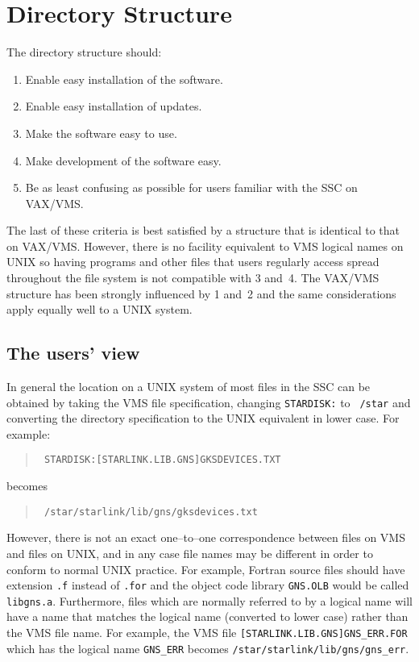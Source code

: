 \section{Directory Structure}
The directory structure should:
\begin{enumerate}
\item Enable easy installation of the software.
\item Enable easy installation of updates.
\item Make the software easy to use.
\item Make development of the software easy.
\item Be as least confusing as possible for users familiar with the SSC on
VAX/VMS.
\end{enumerate}

The last of these criteria is best satisfied by a structure that is identical
to that on VAX/VMS. However, there is no facility equivalent to VMS logical
names on UNIX so having programs and other files that users regularly access
spread throughout the file system is not compatible with 3 and~4. The VAX/VMS
structure has been strongly influenced by 1 and~2 and the same considerations
apply equally well to a UNIX system.

\subsection{The users' view}
In general the location on a UNIX system of most files in the SSC can be
obtained by taking the VMS file specification, changing {\tt STARDISK:} to {\tt
/star} and converting the directory specification to the UNIX equivalent in
lower case. For example:
\begin{quote}\tt
STARDISK:[STARLINK.LIB.GNS]GKSDEVICES.TXT
\end{quote}
becomes
\begin{quote}\tt
/star/starlink/lib/gns/gksdevices.txt
\end{quote}

However, there is not an exact one--to--one correspondence between files on VMS
and files on UNIX, and in any case file names may be different in
order to conform to normal UNIX practice. For example, Fortran source files
should have extension {\tt .f} instead of {\tt .for} and the object code
library {\tt GNS.OLB} would be
called {\tt libgns.a}. Furthermore, files which are normally referred to by a
logical name will have a name that matches the logical name (converted to lower
case) rather than the VMS file name. For example, the VMS file
{\tt [STARLINK.LIB.GNS]GNS\_ERR.FOR} which has the logical name {\tt GNS\_ERR}
becomes {\tt /star/starlink/lib/gns/gns\_err}.

